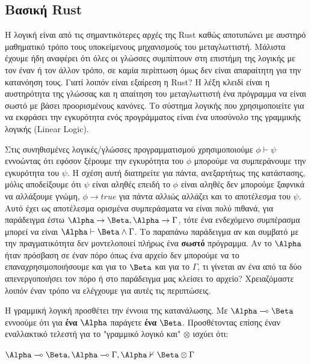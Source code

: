 \subsection{Βασική Rust}

Η λογική είναι από τις σημαντικότερες αρχές της Rust καθώς
αποτυπώνει με αυστηρό μαθηματικό τρόπο τους υποκείμενους
μηχανισμούς του μεταγλωττιστή. Μάλιστα έχουμε ήδη αναφέρει ότι
όλες οι γλώσσες συμπίπτουν στη επιστήμη της λογικής με τον έναν
ή τον άλλον τρόπο, σε καμία περίπτωση όμως δεν είναι απαραίτητη
για την κατανόηση τους. Γιατί λοιπόν είναι εξαίρεση η Rust?
Η λέξη κλειδί είναι η αυστηρότητα της γλώσσας και η απαίτηση του
μεταγλωττιστή ένα πρόγραμμα να είναι σωστό με βάσει προορισμένους
κανόνες. Το σύστημα λογικής που χρησιμοποιείτε για να εκφράσει την
εγκυρότητα ενός προγράμματος είναι ένα υποσύνολο της γραμμικής λογικής
(Linear Logic).

Στις συνηθισμένες λογικές/γλώσσες προγραμματισμού χρησιμοποιούμε $\phi \vdash \psi$
εννοώντας ότι εφόσον ξέρουμε την εγκυρότητα του $\phi$ μπορούμε να συμπεράνουμε
την εγκυρότητα του $\psi$. Η σχέση αυτή διατηρείτε για πάντα, ανεξαρτήτως της
κατάστασης, μόλις αποδείξουμε ότι $\psi$ είναι αληθές επειδή το $\phi$ είναι
αληθές δεν μπορούμε ξαφνικά να αλλάξουμε γνώμη, $\phi \rightarrow true$ για
πάντα αλλιώς αλλάζει και το αποτέλεσμα του $\psi$. Αυτό έχει ως αποτέλεσμα
ορισμένα συμπεράσματα να είναι πολύ πιθανά, για παράδειγμα έστω $\Alpha \rightarrow \Beta,
\Alpha \rightarrow \Gamma$, τότε ένα ενδεχόμενο συμπέρασμα μπορεί να είναι $\Alpha \vdash \Beta \land \Gamma$.
Το παραπάνω παράδειγμα αν και συμβατό με την πραγματικότητα δεν μοντελοποιεί πλήρως
ένα \textbf{σωστό} πρόγραμμα. Αν το $\Alpha$ ήταν πρόσβαση σε έναν πόρο όπως ένα αρχείο
δεν μπορούμε να το επαναχρησιμοποιήσουμε και για το $\Beta$  και για το $\Gamma$, τι γίνεται
αν ένα από τα δύο απενεργοποιήσει τον πόρο ή στο παράδειγμα μας κλείσει το αρχείο? Χρειαζόμαστε
λοιπόν έναν τρόπο να ελέγχουμε για αυτές τις περιπτώσεις.

Η γραμμική λογική προσθέτει την έννοια της κατανάλωσης. Με $\Alpha \multimap \Beta$
εννοούμε ότι για \textbf{ένα} $\Alpha$ παράγετε \textbf{ένα} $\Beta$. Προσθέτοντας
επίσης έναν εναλλακτικό τελεστή για το "γραμμικό λογικό και" $\otimes$ ισχύει ότι:

\begin{center}
    \begin{math}
    \Alpha \multimap \Beta,\Alpha \multimap \Gamma, \Alpha \nvdash \Beta \otimes \Gamma
    \end{math}
\end{center}

